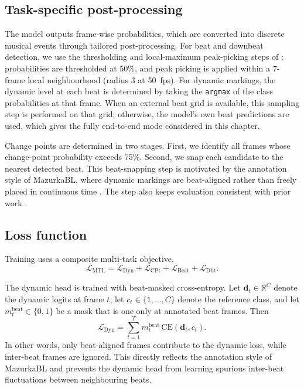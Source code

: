 \subsection{Task-specific post-processing}
\label{ssec:audiodyn_post}

The model outputs frame-wise probabilities, which are converted into discrete musical events through tailored post-processing. For beat and downbeat detection, we use the thresholding and local-maximum peak-picking steps of \cite{foscarin2024beat}: probabilities are thresholded at 50\%, and peak picking is applied within a 7-frame local neighbourhood (radius 3 at 50~fps). For dynamic markings, the dynamic level at each beat is determined by taking the \texttt{argmax} of the class probabilities at that frame. When an external beat grid is available, this sampling step is performed on that grid; otherwise, the model's own beat predictions are used, which gives the fully end-to-end mode considered in this chapter.

Change points are determined in two stages. First, we identify all frames whose change-point probability exceeds 75\%. Second, we snap each candidate to the nearest detected beat. This beat-snapping step is motivated by the annotation style of MazurkaBL, where dynamic markings are beat-aligned rather than freely placed in continuous time \cite{kosta2018mazurkabl}. The step also keeps evaluation consistent with prior work \cite{kosta2017thesis}.

\subsection{Loss function}
\label{ssec:audiodyn_loss}

Training uses a composite multi-task objective,
\begin{equation}
\mathcal{L}_{\mathrm{MTL}} =
\mathcal{L}_{\mathrm{Dyn}} +
\mathcal{L}_{\mathrm{CPt}} +
\mathcal{L}_{\mathrm{Beat}} +
\mathcal{L}_{\mathrm{Dbt}}.
\label{eq:audiodyn_loss}
\end{equation}

The dynamic head is trained with beat-masked cross-entropy. Let $\mathbf{d}_t \in \mathbb{R}^{C}$ denote the dynamic logits at frame $t$, let $c_t \in \{1,\ldots,C\}$ denote the reference class, and let $m_t^{\mathrm{beat}} \in \{0,1\}$ be a mask that is one only at annotated beat frames. Then
\begin{equation}
\mathcal{L}_{\mathrm{Dyn}}
=
\sum_{t=1}^{T}
m_t^{\mathrm{beat}}\,\mathrm{CE}(\mathbf{d}_t,c_t).
\label{eq:audiodyn_dyn_loss}
\end{equation}
In other words, only beat-aligned frames contribute to the dynamic loss, while inter-beat frames are ignored. This directly reflects the annotation style of MazurkaBL and prevents the dynamic head from learning spurious inter-beat fluctuations between neighbouring beats.

